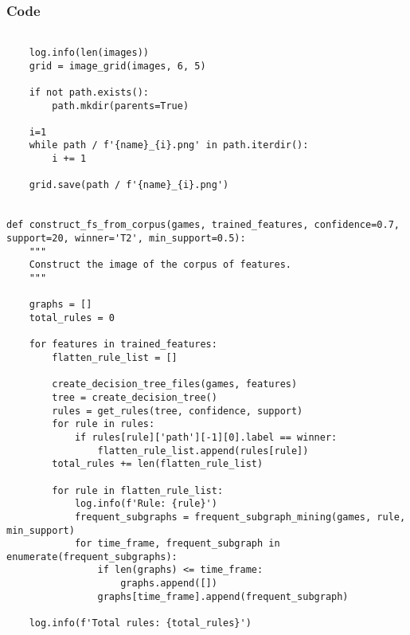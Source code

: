 \documentclass{beamer}
\begin{document}
\begin{frame}[fragile]
    \frametitle{Code}
    \fontsize{3pt}{5pt}\selectfont
    \begin{verbatim}

    log.info(len(images))
    grid = image_grid(images, 6, 5)

    if not path.exists():
        path.mkdir(parents=True)

    i=1
    while path / f'{name}_{i}.png' in path.iterdir():
        i += 1
    
    grid.save(path / f'{name}_{i}.png')


def construct_fs_from_corpus(games, trained_features, confidence=0.7, support=20, winner='T2', min_support=0.5):
    """
    Construct the image of the corpus of features.
    """
    
    graphs = []
    total_rules = 0

    for features in trained_features:
        flatten_rule_list = []

        create_decision_tree_files(games, features)
        tree = create_decision_tree()
        rules = get_rules(tree, confidence, support)
        for rule in rules:
            if rules[rule]['path'][-1][0].label == winner:
                flatten_rule_list.append(rules[rule])
        total_rules += len(flatten_rule_list)

        for rule in flatten_rule_list:
            log.info(f'Rule: {rule}')
            frequent_subgraphs = frequent_subgraph_mining(games, rule, min_support)
            for time_frame, frequent_subgraph in enumerate(frequent_subgraphs):
                if len(graphs) <= time_frame:
                    graphs.append([])
                graphs[time_frame].append(frequent_subgraph)
    
    log.info(f'Total rules: {total_rules}')
    \end{verbatim}
\end{frame}
\end{document}
